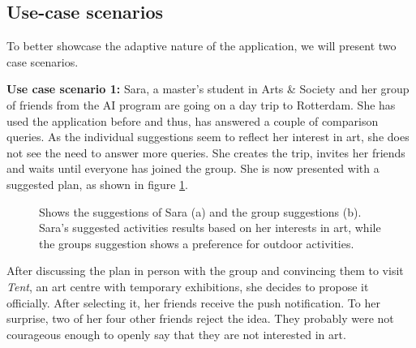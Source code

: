 \documentclass[11pt,a4paper,oneside]{article}
\begin{document}
\subsection{Use-case scenarios}
To better showcase the adaptive nature of the application, we will present two case scenarios.

\textbf{Use case scenario 1:} Sara, a master's student in Arts \& Society and her group of friends from the AI program are going on a day trip to Rotterdam. She has used the application before and thus, has answered a couple of comparison queries. As the individual suggestions seem to reflect her interest in art, she does not see the need to answer more queries. She creates the trip, invites her friends and waits until everyone has joined the group. She is now presented with a suggested plan, as shown in figure \ref{fig:saras_results}.

\begin{figure}[H]
    \centering
    \qquad
    \caption{Shows the suggestions of Sara (a) and the group suggestions (b). Sara's suggested activities results based on her interests in art, while the groups suggestion shows a preference for outdoor activities.}%
    \label{fig:saras_results}%
\end{figure}

After discussing the plan in person with the group and convincing them to visit \emph{Tent}, an art centre with temporary exhibitions, she decides to propose it officially. After selecting it, her friends receive the push notification. To her surprise, two of her four other friends reject the idea. They probably were not courageous enough to openly say that they are not interested in art.  
\end{document}
